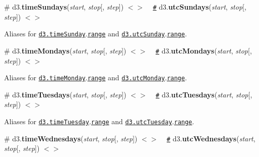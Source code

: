 \label{_timeSundays}%
\# d3.{\bfseries time\+Sundays}({\itshape start}, {\itshape stop}\mbox{[}, {\itshape step}\mbox{]}) \href{https://github.com/d3/d3-time/blob/master/src/week.js#L23}{\tt $<$$>$} ~\newline
\href{#timeSundays}{\tt \#} d3.{\bfseries utc\+Sundays}({\itshape start}, {\itshape stop}\mbox{[}, {\itshape step}\mbox{]}) \href{https://github.com/d3/d3-time/blob/master/src/utcWeek.js#L23}{\tt $<$$>$}

Aliases for \href{#timeSunday}{\tt d3.\+time\+Sunday}.\href{#interval_range}{\tt range} and \href{#timeSunday}{\tt d3.\+utc\+Sunday}.\href{#interval_range}{\tt range}.

\label{_timeMondays}%
\# d3.{\bfseries time\+Mondays}({\itshape start}, {\itshape stop}\mbox{[}, {\itshape step}\mbox{]}) \href{https://github.com/d3/d3-time/blob/master/src/week.js#L24}{\tt $<$$>$} ~\newline
\href{#timeMondays}{\tt \#} d3.{\bfseries utc\+Mondays}({\itshape start}, {\itshape stop}\mbox{[}, {\itshape step}\mbox{]}) \href{https://github.com/d3/d3-time/blob/master/src/utcWeek.js#L24}{\tt $<$$>$}

Aliases for \href{#timeMonday}{\tt d3.\+time\+Monday}.\href{#interval_range}{\tt range} and \href{#timeMonday}{\tt d3.\+utc\+Monday}.\href{#interval_range}{\tt range}.

\label{_timeTuesdays}%
\# d3.{\bfseries time\+Tuesdays}({\itshape start}, {\itshape stop}\mbox{[}, {\itshape step}\mbox{]}) \href{https://github.com/d3/d3-time/blob/master/src/week.js#L25}{\tt $<$$>$} ~\newline
\href{#timeTuesdays}{\tt \#} d3.{\bfseries utc\+Tuesdays}({\itshape start}, {\itshape stop}\mbox{[}, {\itshape step}\mbox{]}) \href{https://github.com/d3/d3-time/blob/master/src/utcWeek.js#L25}{\tt $<$$>$}

Aliases for \href{#timeTuesday}{\tt d3.\+time\+Tuesday}.\href{#interval_range}{\tt range} and \href{#timeTuesday}{\tt d3.\+utc\+Tuesday}.\href{#interval_range}{\tt range}.

\label{_timeWednesdays}%
\# d3.{\bfseries time\+Wednesdays}({\itshape start}, {\itshape stop}\mbox{[}, {\itshape step}\mbox{]}) \href{https://github.com/d3/d3-time/blob/master/src/week.js#L26}{\tt $<$$>$} ~\newline
\href{#timeWednesdays}{\tt \#} d3.{\bfseries utc\+Wednesdays}({\itshape start}, {\itshape stop}\mbox{[}, {\itshape step}\mbox{]}) \href{https://github.com/d3/d3-time/blob/master/src/utcWeek.js#L26}{\tt $<$$>$}

